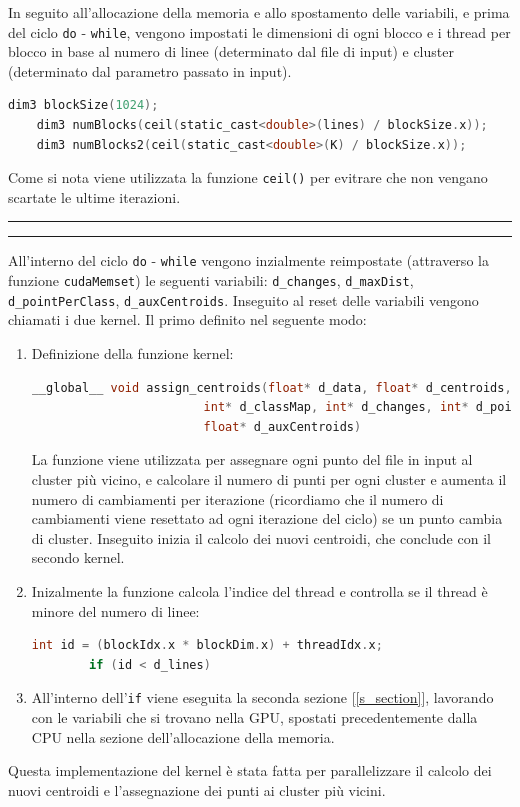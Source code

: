 \documentclass{article}
\begin{document}
  In seguito all'allocazione della memoria e allo spostamento delle variabili, e prima del ciclo \verb|do| - \verb|while|, 
  vengono impostati le dimensioni di ogni blocco e i thread per blocco in base al numero di linee (determinato dal file di input) e cluster (determinato dal parametro passato in input).
  \begin{lstlisting}[language=C]
    dim3 blockSize(1024);
    dim3 numBlocks(ceil(static_cast<double>(lines) / blockSize.x));
    dim3 numBlocks2(ceil(static_cast<double>(K) / blockSize.x));
  \end{lstlisting}
  Come si nota viene utilizzata la funzione \verb|ceil()| per evitrare che non vengano scartate le ultime iterazioni.
  \begin{center}
    \rule{2.5cm}{1pt}  \rule{2.5cm}{1pt}
  \end{center}
  All'interno del ciclo \verb|do| - \verb|while| vengono inzialmente reimpostate (attraverso la funzione \verb|cudaMemset|) le seguenti variabili: \verb|d_changes|, \verb|d_maxDist|, \verb|d_pointPerClass|, \verb|d_auxCentroids|.
  Inseguito al reset delle variabili vengono chiamati i due kernel. Il primo definito nel seguente modo:
  \begin{enumerate}
    \item Definizione della funzione kernel:
      \begin{lstlisting}[language=C, xleftmargin=-5em]
        __global__ void assign_centroids(float* d_data, float* d_centroids, 
                        int* d_classMap, int* d_changes, int* d_pointsPerClass,
                        float* d_auxCentroids)
      \end{lstlisting}
      La funzione viene utilizzata per assegnare ogni punto del file in input al cluster più vicino, e calcolare il numero di punti per ogni cluster e aumenta 
      il numero di cambiamenti per iterazione (ricordiamo che il numero di cambiamenti viene resettato ad ogni iterazione del ciclo) se un punto cambia di cluster. Inseguito
      inizia il calcolo dei nuovi centroidi, che conclude con il secondo kernel.
    \item Inizalmente la funzione calcola l'indice del thread e controlla se il thread è minore del numero di linee:
      \begin{lstlisting}[language=C, xleftmargin=-5em]
        int id = (blockIdx.x * blockDim.x) + threadIdx.x;
        if (id < d_lines)
      \end{lstlisting}
    \item All'interno dell'\verb|if| viene eseguita la seconda sezione [\ref{s_section}], lavorando con le variabili che si trovano nella GPU, spostati precedentemente dalla CPU nella sezione 
      dell'allocazione della memoria.
  \end{enumerate}
  Questa implementazione del kernel è stata fatta per parallelizzare il calcolo dei nuovi centroidi e l'assegnazione dei punti ai cluster più vicini.
\end{document}
